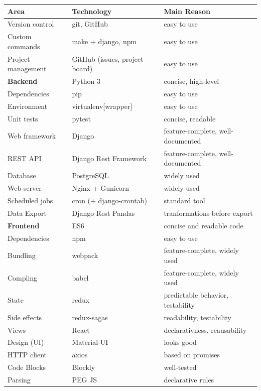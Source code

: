 \begin{table}[h]
\begin{center}
\begin{tabular}{l l l}
\toprule
Area & Technology & Main Reason  \\
\midrule
Version control & git, GitHub & easy to use \\
Custom commands & make + django, npm & easy to use \\
Project management & GitHub (issues, project board) & easy to use \\
\hline
\textbf{Backend} & Python 3 & concise, high-level \\
Dependencies & pip & easy to use \\
Environment & virtualenv[wrapper] & easy to use \\
Unit tests & pytest & concise, readable \\
Web framework & Django & feature-complete, well-documented \\
REST API & Django Rest Framework & feature-complete, well-documented \\
Database & PostgreSQL & widely used \\
Web server & Nginx + Gunicorn & widely used \\
Scheduled jobs & cron (+ django-crontab) & standard tool \\
Data Export & Django Rest Pandas & tranformations before export \\
\hline
\textbf{Frontend} & ES6 & concise and readable code \\
Dependencies & npm & easy to use \\
Bundling & webpack & feature-complete, widely used \\
Compling & babel & feature-complete, widely used \\
State & redux  & predictable behavior, testability \\
Side effects & redux-sagas  & readability, testability \\
Views & React & declarativness, reausability \\
Design (UI) & Material-UI & looks good \\
HTTP client & axios & based on promises \\
Code Blocks & Blockly & well-tested \\
Parsing & PEG JS & declarative rules \\  %

\end{tabular}
\end{center}
\end{table}
